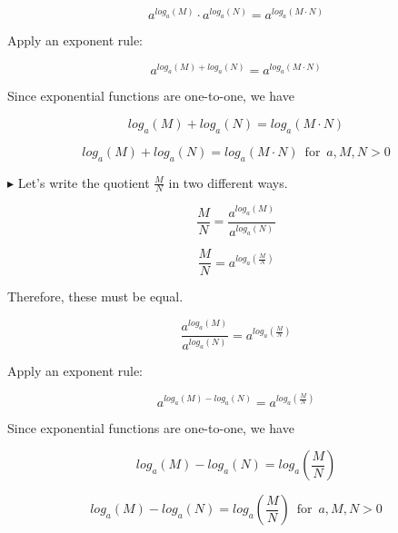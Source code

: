 \documentclass{ximera}
\begin{document}
\[    a^{log_a(M)} \cdot a^{log_a(N)}     =   a^{log_a(M \cdot N)}                \]


Apply an exponent rule:


\[    a^{log_a(M)+log_a(N)}    =   a^{log_a(M \cdot N)}                \]



Since exponential functions are one-to-one, we have 


\[    log_a(M)+log_a(N)    =   log_a(M \cdot N)               \]




\begin{fact} 

\[    log_a(M)+log_a(N)    =   log_a(M \cdot N)      \, \text{ for } \, a, M, N > 0        \]


\end{fact}




$\blacktriangleright$  Let's write the quotient $\frac{M}{N}$ in two different ways.



\[   \frac{M}{N} = \frac{a^{log_a(M)}}{a^{log_a(N)}}                    \]

\[   \frac{M}{N} = a^{log_a\left(\frac{M}{N}\right)}                  \]


Therefore, these must be equal.


\[    \frac{a^{log_a(M)}}{a^{log_a(N)}}    =   a^{log_a\left(\frac{M}{N}\right)}                \]


Apply an exponent rule:


\[    a^{log_a(M) - log_a(N)}    =   a^{log_a\left(\frac{M}{N}\right)}                \]



Since exponential functions are one-to-one, we have 


\[    log_a(M)-log_a(N)    =   log_a\left(\frac{M}{N}\right)             \]








\begin{fact} 

\[    log_a(M)-log_a(N)    =   log_a\left(\frac{M}{N}\right)        \, \text{ for } \, a, M, N > 0        \]


\end{fact}
\end{document}
